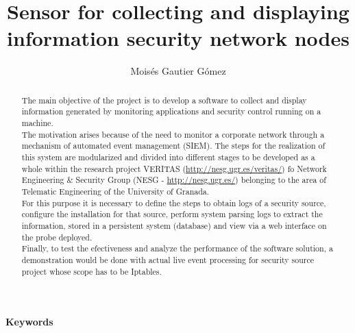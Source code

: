 \documentclass{article}
\begin{document}
\title{Sensor for collecting and displaying information security network nodes}
\author{Moisés Gautier Gómez}
\date{ }
\maketitle
\begin{center}
\small{\textbf{Keywords}}
\end{center}

\begin{abstract}
  The main objective of the project is to develop a software to collect and display information generated by monitoring applications and security control running on a machine.\\

  The motivation arises because of the need to monitor a corporate network through a mechanism of automated event management (SIEM). The steps for the realization of this system are modularized and divided into different stages to be developed as a whole within the research project VERITAS (\url{http://nesg.ugr.es/veritas/}) fo Network Engineering \& Security Group (NESG - \url{http://nesg.ugr.es/}) belonging to the area of Telematic Engineering of the University of Granada.\\

  For this purpose it is necessary to define the steps to obtain logs of a security source, configure the installation for that source, perform system parsing logs to extract the information, stored in a persistent system (database) and view via a web interface on the probe deployed.\\

  Finally, to test the efectiveness and analyze the performance of the software solution, a demonstration would be done with actual live event processing for security source project whose scope has to be Iptables.\\
\end{abstract}
\end{document}
